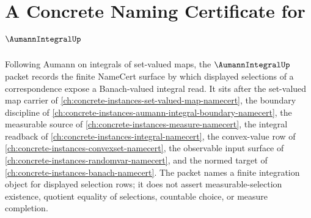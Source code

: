 \chapter{A Concrete Naming Certificate for $\AumannIntegralUp$}
\label{ch:concrete-instances-aumann-integral-namecert}

Following Aumann on integrals of set-valued maps, the $\AumannIntegralUp$ packet records the finite NameCert surface by which displayed selections of a correspondence expose a Banach-valued integral read. It sits after the set-valued map carrier of \autoref{ch:concrete-instances-set-valued-map-namecert}, the boundary discipline of \autoref{ch:concrete-instances-aumann-integral-boundary-namecert}, the measurable source of \autoref{ch:concrete-instances-measure-namecert}, the integral readback of \autoref{ch:concrete-instances-integral-namecert}, the convex-value row of \autoref{ch:concrete-instances-convexset-namecert}, the observable input surface of \autoref{ch:concrete-instances-randomvar-namecert}, and the normed target of \autoref{ch:concrete-instances-banach-namecert}. The packet names a finite integration object for displayed selection rows; it does not assert measurable-selection existence, quotient equality of selections, countable choice, or measure completion.


